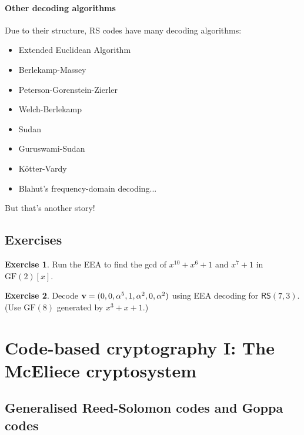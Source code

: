 \documentclass[a4paper, 11pt, openany]{book}
\numberwithin{equation}{section}
\theoremstyle{plain}
\theoremstyle{definition}
\newtheorem{exercise}   {Exercise}  [section]
\newcommand{\GF}{\mathrm{GF}}
\newcommand{\code}[1]{\mathsf{#1}}
\begin{document}
\paragraph{Other decoding algorithms}
Due to their structure, RS codes have many decoding algorithms:
\begin{itemize}
	\item Extended Euclidean Algorithm

	\item Berlekamp-Massey

	\item Peterson-Gorenstein-Zierler

	\item Welch-Berlekamp

	\item Sudan

	\item Guruswami-Sudan

	\item K\"otter-Vardy
	
	\item Blahut's frequency-domain decoding...
\end{itemize}

But that's another story!




\subsection{Exercises}

\begin{exercise}
Run the EEA to find the gcd of $x^{10} + x^6 + 1$ and $x^7 + 1$ in $\GF(2)[x]$.
\end{exercise}


\begin{exercise}
Decode ${\bf v} = (0, 0, \alpha^5, 1, \alpha^2, 0, \alpha^2)$ using EEA decoding for $\code{RS}(7,3)$. (Use $\GF(8)$ generated by $x^3 + x + 1$.)
\end{exercise}







\section{Code-based cryptography I: The McEliece cryptosystem}
\label{sec:29}




\subsection{Generalised Reed-Solomon codes and Goppa codes}
\end{document}
